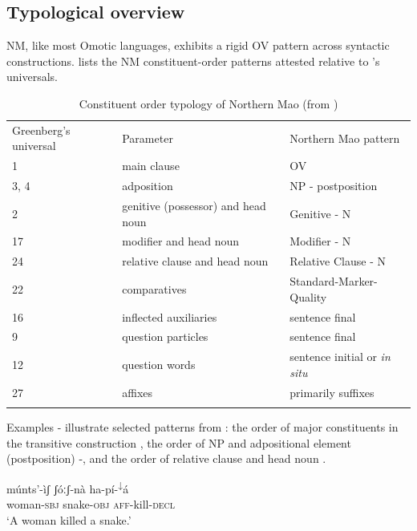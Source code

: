 \documentclass[output=paper]{langsci/langscibook}
\begin{document}
\subsection{Typological overview}\label{sec:mahland:1.1}

NM, like most Omotic languages, exhibits a rigid OV pattern across syntactic constructions.  lists the NM constituent-order patterns attested relative to \cite{Greenberg1993}'s universals. 

\begin{table}
\caption{Constituent order typology of Northern Mao (from \citealt[48]{Ahland2012})}
\label{tab:1}
  	\centering
\begin{tabularx}{\textwidth}{XXX}
\lsptoprule

Greenberg's universal & Parameter & Northern Mao pattern\\
1 & main clause & OV\\
3, 4 & adposition & NP - postposition \\
2 & genitive (possessor) and head noun & Genitive - N\\
17 & modifier and head noun & Modifier - N\\
24 & \mdseries relative clause\index{subordination!relative clauses} and head noun & Relative Clause - N\\
22 & comparatives & Standard-Marker-Quality\\
16 & inflected auxiliaries & sentence final\\
9 & question particles & sentence final\\
12 & question words & sentence initial or \textit{in situ}\\
27 & affixes & primarily suffixes\\
\lspbottomrule
\end{tabularx}
\end{table}

Examples - illustrate selected patterns from : the order of major constituents in the transitive construction , the order of NP and adpositional element (postposition) -, and the order of relative clause and head noun . 

\ea\label{ex:mahland:1}
\gll  m\'{u}nts'-\`{i}ʃ       ʃ\'{o}ːʃ-n\`{a}          ha-p\'{i}-\textsuperscript{↓}\'{a} \\
woman\textsc{{}-sbj}    snake\textsc{{}-obj}     \textsc{aff-}kill\textsc{{}-decl }\\
\glt `A woman killed a snake.'
\z        
\end{document}
